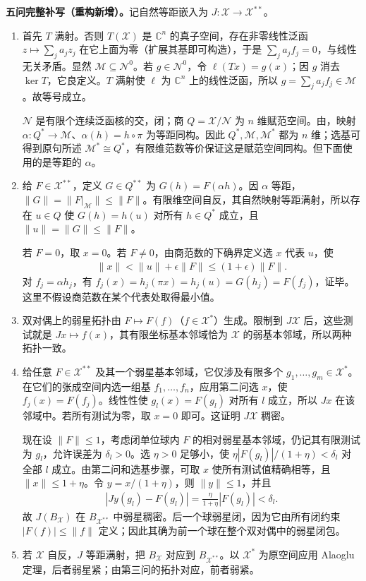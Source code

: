 \documentclass[../../main.tex]{subfiles}
\begin{document}
\begin{solution}
\textbf{五问完整补写（重构新增）。}记自然等距嵌入为 $J:\mathcal X\to\mathcal X^{**}$。
\begin{enumerate}
\item 首先 $T$ 满射。否则 $T(\mathcal X)$ 是 $\mathbb C^n$ 的真子空间，存在非零线性泛函 $z\mapsto\sum_j a_jz_j$ 在它上面为零（扩展其基即可构造），于是 $\sum_j a_jf_j=0$，与线性无关矛盾。显然 $\mathcal M\subseteq\mathcal N^0$。若 $g\in\mathcal N^0$，令 $\ell(Tx)=g(x)$；因 $g$ 消去 $\ker T$，它良定义。$T$ 满射使 $\ell$ 为 $\mathbb C^n$ 上的线性泛函，所以 $g=\sum_j a_j f_j\in\mathcal M$。故等号成立。

$\mathcal N$ 是有限个连续泛函核的交，闭；商 $Q=\mathcal X/\mathcal N$ 为 $n$ 维赋范空间。由，映射 $\alpha:Q^*\to\mathcal M$、$\alpha(h)=h\circ\pi$ 为等距同构。因此 $Q^*,\mathcal M,\mathcal M^*$ 都为 $n$ 维；选基可得到原句所述 $\mathcal M^*\cong Q^*$，有限维范数等价保证这是赋范空间同构。但下面使用的是等距的 $\alpha$。
\item 给 $F\in\mathcal X^{**}$，定义 $G\in Q^{**}$ 为 $G(h)=F(\alpha h)$。因 $\alpha$ 等距，$\|G\|=\|F|_{\mathcal M}\|\le\|F\|$。有限维空间自反，其自然映射等距满射，所以存在 $u\in Q$ 使 $G(h)=h(u)$ 对所有 $h\in Q^*$ 成立，且 $\|u\|=\|G\|\le\|F\|$。

若 $F=0$，取 $x=0$。若 $F\ne0$，由商范数的下确界定义选 $x$ 代表 $u$，使
\begin{align*}
\|x\|<\|u\|+\epsilon\|F\|\le(1+\epsilon)\|F\|.
\end{align*}
对 $f_j=\alpha h_j$，有 $f_j(x)=h_j(\pi x)=h_j(u)=G(h_j)=F(f_j)$，证毕。这里不假设商范数在某个代表处取得最小值。
\item 双对偶上的弱星拓扑由 $F\mapsto F(f)$（$f\in\mathcal X^*$）生成。限制到 $J\mathcal X$ 后，这些测试就是 $Jx\mapsto f(x)$，其有限坐标基本邻域恰为 $\mathcal X$ 的弱基本邻域，所以两种拓扑一致。
\item 给任意 $F\in\mathcal X^{**}$ 及其一个弱星基本邻域，它仅涉及有限多个 $g_1,\ldots,g_m\in\mathcal X^*$。在它们的张成空间内选一组基 $f_1,\ldots,f_n$，应用第二问选 $x$，使 $f_j(x)=F(f_j)$。线性性使 $g_l(x)=F(g_l)$ 对所有 $l$ 成立，所以 $Jx$ 在该邻域中。若所有测试为零，取 $x=0$ 即可。这证明 $J\mathcal X$ 稠密。

现在设 $\|F\|\le1$，考虑闭单位球内 $F$ 的相对弱星基本邻域，仍记其有限测试为 $g_l$，允许误差为 $\delta_l>0$。选 $\eta>0$ 足够小，使 $\eta|F(g_l)|/(1+\eta)<\delta_l$ 对全部 $l$ 成立。由第二问和选基步骤，可取 $x$ 使所有测试值精确相等，且 $\|x\|\le1+\eta$。令 $y=x/(1+\eta)$，则 $\|y\|\le1$，并且
\begin{align*}
|Jy(g_l)-F(g_l)|=\frac{\eta}{1+\eta}|F(g_l)|<\delta_l.
\end{align*}
故 $J(B_{\mathcal X})$ 在 $B_{\mathcal X^{**}}$ 中弱星稠密。后一个球弱星闭，因为它由所有闭约束 $|F(f)|\le\|f\|$ 定义；因此其确为前一个球在整个双对偶中的弱星闭包。
\item 若 $\mathcal X$ 自反，$J$ 等距满射，把 $B_{\mathcal X}$ 对应到 $B_{\mathcal X^{**}}$。以 $\mathcal X^*$ 为原空间应用 Alaoglu 定理，后者弱星紧；由第三问的拓扑对应，前者弱紧。


\end{enumerate}
\end{solution}
\end{document}
